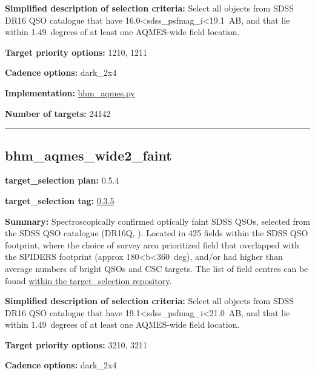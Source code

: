 \noindent\textbf{Simplified description of selection criteria:} Select all
objects from SDSS DR16 QSO catalogue that have
16.0\textless sdss\_psfmag\_i\textless19.1~AB, and that lie within
1.49~degrees of at least one AQMES-wide field location.


\noindent\textbf{Target priority options:} 1210, 1211

\noindent\textbf{Cadence options:} dark\_2x4

\noindent\textbf{Implementation:}
\href{https://github.com/sdss/target_selection/blob/0.3.5/python/target_selection/cartons/bhm_aqmes.py}{bhm\_aqmes.py}

\noindent\textbf{Number of targets:} 24142

\begin{center}\rule{0.5\linewidth}{0.5pt}\end{center}

\hypertarget{bhm_aqmes_wide2_faint_plan0.5.4}{%
\subsection{bhm\_aqmes\_wide2\_faint}\label{bhm_aqmes_wide2_faint_plan0.5.4}}

\noindent\textbf{target\_selection plan:} 0.5.4

\noindent\textbf{target\_selection tag:}
\href{https://github.com/sdss/target_selection/tree/0.3.5/}{0.3.5}

\noindent\textbf{Summary:} Spectroscopically confirmed optically faint SDSS QSOs,
selected from the SDSS QSO catalogue (DR16Q,
\citealt{Lyke2020}). Located in 425 fields within the SDSS QSO footprint,
where the choice of survey area prioritized field that overlapped with
the SPIDERS footprint (approx 180\textless b\textless360~deg), and/or
had higher than average numbers of bright QSOs and CSC targets. The list
of field centres can be found
\href{https://github.com/sdss/target_selection/blob/0.3.0/python/target_selection/masks/candidate_target_fields_bhm_aqmes_wide_v0.3.1.fits}{within
the target\_selection repository}.

\noindent\textbf{Simplified description of selection criteria:} Select all
objects from SDSS DR16 QSO catalogue that have
19.1\textless sdss\_psfmag\_i\textless21.0~AB, and that lie within
1.49~degrees of at least one AQMES-wide field location.


\noindent\textbf{Target priority options:} 3210, 3211

\noindent\textbf{Cadence options:} dark\_2x4

